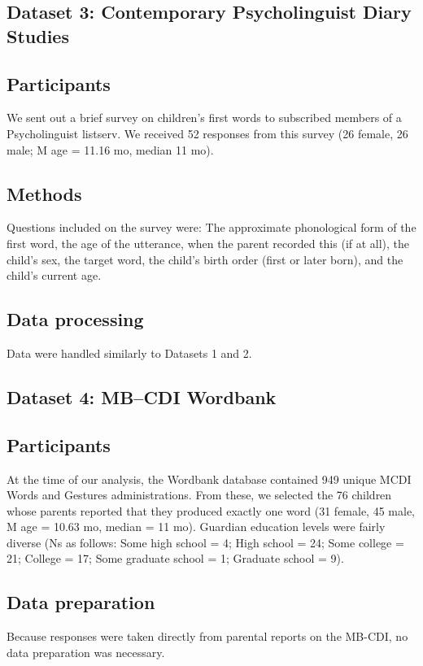 \documentclass[10pt,letterpaper]{article}
\begin{document}
\subsection{Dataset 3: Contemporary Psycholinguist Diary Studies}

\subsection{Participants}
We sent out a brief survey on children's first words to subscribed members of a Psycholinguist listserv. We received 52 responses from this survey (26 female, 26 male; M age = 11.16 mo, median 11 mo).

\subsection{Methods}
Questions included on the survey were: The approximate phonological form of the first word, the age of the utterance, when the parent recorded this (if at all), the child's sex, the target word, the child's birth order (first or later born), and the child's current age. 

\subsection{Data processing}
Data were handled similarly to Datasets 1 and 2. 

\subsection{Dataset 4: MB--CDI Wordbank}

\subsection{Participants}
At the time of our analysis, the Wordbank database contained 949 unique MCDI Words and Gestures administrations. From these, we selected the 76 children whose parents reported that they produced exactly one word (31 female, 45 male, M age = 10.63 mo, median = 11 mo). Guardian education levels were fairly diverse (Ns as follows: Some high school = 4; High school = 24; Some college = 21; College = 17; Some graduate school = 1; Graduate school = 9). 

\subsection{Data preparation}
Because responses were taken directly from parental reports on the MB-CDI, no data preparation was necessary.
\end{document}
